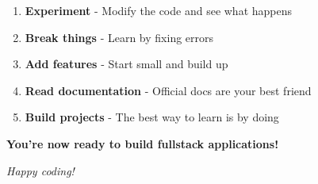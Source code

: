 \documentclass[12pt,a4paper]{article}
\begin{document}
\begin{enumerate}
    \item \textbf{Experiment} - Modify the code and see what happens
    \item \textbf{Break things} - Learn by fixing errors
    \item \textbf{Add features} - Start small and build up
    \item \textbf{Read documentation} - Official docs are your best friend
    \item \textbf{Build projects} - The best way to learn is by doing
\end{enumerate}

\vspace{1cm}

\begin{center}
\Large\textbf{You're now ready to build fullstack applications!}

\vspace{0.5cm}

\textit{Happy coding! 🚀}
\end{center}
\end{document}
